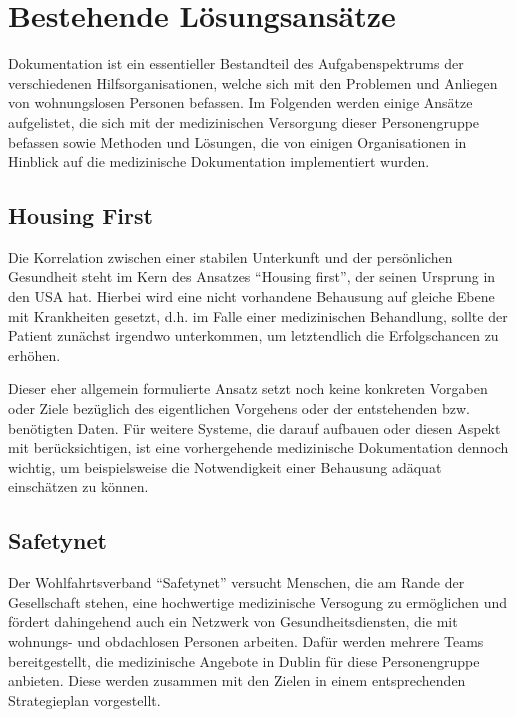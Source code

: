 \section{Bestehende Lösungsansätze}\label{sec:approaches}

Dokumentation ist ein essentieller Bestandteil des Aufgabenspektrums der verschiedenen Hilfsorganisationen, welche sich mit den Problemen und Anliegen von wohnungslosen Personen befassen. Im Folgenden werden einige Ansätze aufgelistet, die sich mit der medizinischen Versorgung dieser Personengruppe befassen sowie Methoden und Lösungen, die von einigen Organisationen in Hinblick auf die medizinische Dokumentation implementiert wurden.

\subsection{Housing First}

Die Korrelation zwischen einer stabilen Unterkunft und der persönlichen Gesundheit steht im Kern des Ansatzes \enquote{Housing first}, der seinen Ursprung in den USA hat. Hierbei wird eine nicht vorhandene Behausung auf gleiche Ebene mit Krankheiten gesetzt, d.h. im Falle einer medizinischen Behandlung, sollte der Patient zunächst irgendwo unterkommen, um letztendlich die Erfolgschancen zu erhöhen. 

Dieser eher allgemein formulierte Ansatz setzt noch keine konkreten Vorgaben oder Ziele bezüglich des eigentlichen Vorgehens oder der entstehenden bzw. benötigten Daten. Für weitere Systeme, die darauf aufbauen oder diesen Aspekt mit berücksichtigen, ist eine vorhergehende medizinische Dokumentation dennoch wichtig, um beispielsweise die Notwendigkeit einer Behausung adäquat einschätzen zu können. \citep{Srebnik.2013}

\subsection{Safetynet}

Der Wohlfahrtsverband \enquote{Safetynet} versucht Menschen, die am Rande der Gesellschaft stehen, eine hochwertige medizinische Versogung zu ermöglichen und fördert dahingehend auch ein Netzwerk von Gesundheitsdiensten, die mit wohnungs- und obdachlosen Personen arbeiten. Dafür werden mehrere Teams bereitgestellt, die medizinische Angebote in Dublin für diese Personengruppe anbieten. Diese werden zusammen mit den Zielen in einem entsprechenden Strategieplan vorgestellt. \citep{Safetynet.2022}


